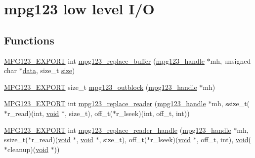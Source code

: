 \hypertarget{group__mpg123__lowio}{}\section{mpg123 low level I/O}
\label{group__mpg123__lowio}
\subsection*{Functions}
\begin{DoxyCompactItemize}
\item 
\mbox{\hyperlink{mpg123_8h_a2ba98cfba3f760879df70e755b2a61cc}{M\+P\+G123\+\_\+\+E\+X\+P\+O\+RT}} int \mbox{\hyperlink{group__mpg123__lowio_gaaae8cfb0de3a2bc1dc97d916aa519772}{mpg123\+\_\+replace\+\_\+buffer}} (\mbox{\hyperlink{group__mpg123__init_ga6728e2839a395f3a07d4514da659faca}{mpg123\+\_\+handle}} $\ast$mh, unsigned char $\ast$\mbox{\hyperlink{_s_d_l__opengl_8h_a2e335d56e2846b0fea47eed068b2d34a}{data}}, size\+\_\+t \mbox{\hyperlink{_s_d_l__opengl__glext_8h_a3d1e3edfcf61ca2d831883e1afbad89e}{size}})
\item 
\mbox{\hyperlink{mpg123_8h_a2ba98cfba3f760879df70e755b2a61cc}{M\+P\+G123\+\_\+\+E\+X\+P\+O\+RT}} size\+\_\+t \mbox{\hyperlink{group__mpg123__lowio_ga00c0874bdad4a3f6366a035694f298d6}{mpg123\+\_\+outblock}} (\mbox{\hyperlink{group__mpg123__init_ga6728e2839a395f3a07d4514da659faca}{mpg123\+\_\+handle}} $\ast$mh)
\item 
\mbox{\hyperlink{mpg123_8h_a2ba98cfba3f760879df70e755b2a61cc}{M\+P\+G123\+\_\+\+E\+X\+P\+O\+RT}} int \mbox{\hyperlink{group__mpg123__lowio_ga00a65b6bc6d3e56e3c055943c30894ab}{mpg123\+\_\+replace\+\_\+reader}} (\mbox{\hyperlink{group__mpg123__init_ga6728e2839a395f3a07d4514da659faca}{mpg123\+\_\+handle}} $\ast$mh, ssize\+\_\+t($\ast$r\+\_\+read)(int, \mbox{\hyperlink{_s_d_l__opengles2__gl2ext_8h_ae5d8fa23ad07c48bb609509eae494c95}{void}} $\ast$, size\+\_\+t), off\+\_\+t($\ast$r\+\_\+lseek)(int, off\+\_\+t, int))
\item 
\mbox{\hyperlink{mpg123_8h_a2ba98cfba3f760879df70e755b2a61cc}{M\+P\+G123\+\_\+\+E\+X\+P\+O\+RT}} int \mbox{\hyperlink{group__mpg123__lowio_ga61a125c56f2aab9590a4b1a29194dc10}{mpg123\+\_\+replace\+\_\+reader\+\_\+handle}} (\mbox{\hyperlink{group__mpg123__init_ga6728e2839a395f3a07d4514da659faca}{mpg123\+\_\+handle}} $\ast$mh, ssize\+\_\+t($\ast$r\+\_\+read)(\mbox{\hyperlink{_s_d_l__opengles2__gl2ext_8h_ae5d8fa23ad07c48bb609509eae494c95}{void}} $\ast$, \mbox{\hyperlink{_s_d_l__opengles2__gl2ext_8h_ae5d8fa23ad07c48bb609509eae494c95}{void}} $\ast$, size\+\_\+t), off\+\_\+t($\ast$r\+\_\+lseek)(\mbox{\hyperlink{_s_d_l__opengles2__gl2ext_8h_ae5d8fa23ad07c48bb609509eae494c95}{void}} $\ast$, off\+\_\+t, int), \mbox{\hyperlink{_s_d_l__opengles2__gl2ext_8h_ae5d8fa23ad07c48bb609509eae494c95}{void}}($\ast$cleanup)(\mbox{\hyperlink{_s_d_l__opengles2__gl2ext_8h_ae5d8fa23ad07c48bb609509eae494c95}{void}} $\ast$))
\end{DoxyCompactItemize}


